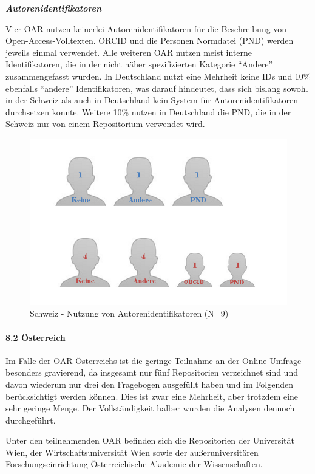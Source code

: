 \documentclass[a4paper,
fontsize=11pt,
oneside,
numbers=noperiodatend,
parskip=half-,
bibliography=totoc,
final
]{scrartcl}
\begin{document}
\textbf{\emph{Autorenidentifikatoren}}

Vier OAR nutzen keinerlei Autorenidentifikatoren für die Beschreibung
von Open-Access-Voll\-texten. ORCID und die Personen Normdatei (PND)
werden jeweils einmal verwendet. Alle weiteren OAR nutzen meist interne
Identifikatoren, die in der nicht näher spezifizierten Kategorie
\enquote{Andere} zusammengefasst wurden. In Deutschland nutzt eine
Mehrheit keine IDs und 10\% ebenfalls \enquote{andere} Identifikatoren,
was darauf hindeutet, dass sich bislang sowohl in der Schweiz als auch
in Deutschland kein System für Autorenidentifikatoren durchsetzen
konnte. Weitere 10\% nutzen in Deutschland die PND, die in der Schweiz
nur von einem Repositorium verwendet wird.

\begin{figure}[htbp]
\centering
\includegraphics{img/abb9_autorenidentifikatoren.jpg}
\caption{Schweiz - Nutzung von Autorenidentifikatoren
(N=9)}
\end{figure}

\paragraph{8.2 Österreich}\label{uxf6sterreich-3}

Im Falle der OAR Österreichs ist die geringe Teilnahme an der
Online-Umfrage besonders gravierend, da insgesamt nur fünf Repositorien
verzeichnet sind und davon wiederum nur drei den Fragebogen ausgefüllt
haben und im Folgenden berücksichtigt werden können. Dies ist zwar eine
Mehrheit, aber trotzdem eine sehr geringe Menge. Der Vollständigkeit
halber wurden die Analysen dennoch durchgeführt.

Unter den teilnehmenden OAR befinden sich die Repositorien der
Universität Wien, der Wirtschaftsuniversität Wien sowie der
außeruniversitären Forschungseinrichtung Österreichische Akademie der
Wissenschaften.
\end{document}
